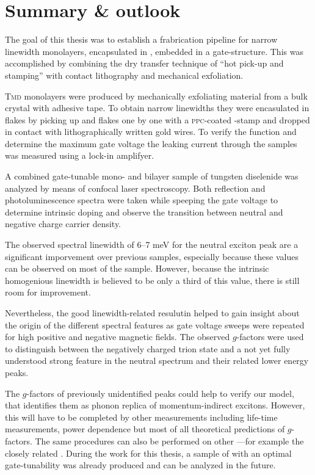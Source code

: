 \chapter{Summary \& outlook}

The goal of this thesis was to establish a frabrication pipeline for narrow linewidth \tmdg monolayers, encapsulated in \hbn, embedded in a gate-structure. This was accomplished by combining the dry transfer technique of ``hot pick-up and stamping'' with contact lithography and mechanical exfoliation.

\textsc{Tmd} monolayers were produced by mechanically exfoliating material from a bulk crystal with adhesive tape. To obtain narrow linewidths they were encasulated in \hbng flakes by picking up \hbng and \tmdg flakes one by one with a \textsc{ppc}-coated \pdms-stamp and dropped in contact with lithographically written gold wires. To verify the function and determine the maximum gate voltage the leaking current through the samples was measured using a lock-in amplifyer.

A combined gate-tunable mono- and bilayer sample of tungsten diselenide was analyzed by means of confocal laser spectroscopy. Both reflection and photoluminescence spectra were taken while speeping the gate voltage to determine intrinsic doping and observe the transition between neutral and negative charge carrier density.

The observed spectral linewidth of 6--7 meV for the neutral exciton peak are a significant imporvement over previous samples, especially because these values can be observed on most of the sample. However, because the intrinsic homogenious linewidth is believed to be only a third of this value, there is still room for improvement.

Nevertheless, the good linewidth-related resulutin helped to gain insight about the origin of the different spectral features as gate voltage sweeps were repeated for high positive and negative magnetic fields. The observed $g$-factors were used to distinguish between the negatively charged trion state and a not yet fully understood strong feature in the neutral spectrum and their related lower energy peaks.

The $g$-factors of previously unidentified peaks could help to verify our model, that identifies them as phonon replica of momentum-indirect excitons. However, this will have to be completed by other measurements including life-time measurements, power dependence but most of all theoretical predictions of $g$-factors. The same procedures can also be performed on other \tmds\!---for example the closely related \ws\!. During the work for this thesis, a sample of \ws with an optimal gate-tunability was already produced and can be analyzed in the future.


